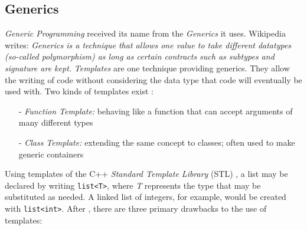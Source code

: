 %
%
%
%
%
%
%

\subsection{Generics}
\label{generics_heading}

\emph{Generic Programming} received its name from the \emph{Generics} it uses.
Wikipedia \cite{wikipedia} writes: \textit{Generics is a technique that allows
one value to take different datatypes (so-called polymorphism) as long as
certain contracts such as subtypes and signature are kept.} \emph{Templates}
are one technique providing generics. They allow the writing of code without
considering the data type that code will eventually be used with. Two kinds of
templates exist \cite{wikipedia}:

\begin{itemize}
    \item[-] \emph{Function Template:} behaving like a function that can accept
        arguments of many different types
    \item[-] \emph{Class Template:} extending the same concept to classes;
        often used to make generic containers
\end{itemize}

Using templates of the C++ \emph{Standard Template Library} (STL) \cite{stl},
a list may be declared by writing \texttt{list<T>}, where \emph{T} represents
the type that may be substituted as needed. A linked list of integers, for
example, would be created with \texttt{list<int>}. After \cite{wikipedia},
there are three primary drawbacks to the use of templates:

